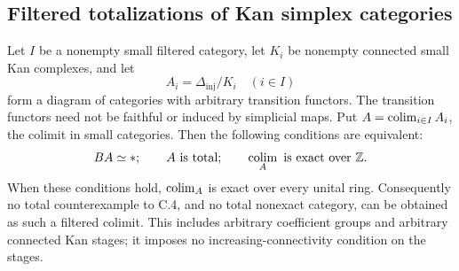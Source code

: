 \subsection{Filtered totalizations of Kan simplex categories}

\begin{theorem}
\label{C:kan-filtered-totalization}
Let $I$ be a nonempty small filtered category, let $K_i$ be nonempty
connected small Kan complexes, and let
\[
 A_i=\Delta_{\mathrm{inj}}/K_i\quad(i\in I)
\]
form a diagram of categories with arbitrary transition functors.
The transition functors need not be faithful or induced by simplicial
maps. Put $A=\operatorname*{colim}_{i\in I}A_i$, the colimit in small categories.
Then the following conditions are equivalent:
\[
 BA\simeq *;\qquad A\text{ is total};\qquad
 \operatorname*{colim}_A\text{ is exact over }\mathbb Z.
\]
When these conditions hold, $\operatorname*{colim}_A$ is exact over every unital ring.
Consequently no total counterexample to C.4, and no total nonexact
category, can be obtained as such a filtered colimit. This includes
arbitrary coefficient groups and arbitrary connected Kan stages;
it imposes no increasing-connectivity condition on the stages.
\end{theorem}
